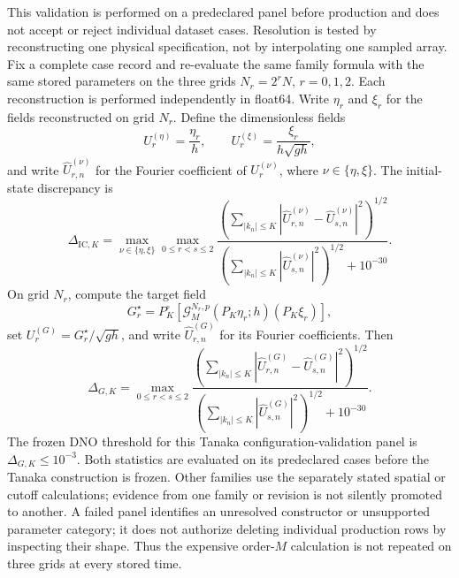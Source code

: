 \documentclass[11pt]{article}
\newcommand{\G}{\mathcal G}
\begin{document}
This validation is performed on a predeclared panel before production and
does not accept or reject individual dataset cases.  Resolution is tested by
reconstructing one physical specification, not by
interpolating one sampled array.  Fix a complete case record and re-evaluate
the same family formula with the same stored parameters on the three grids
$N_r=2^rN$, $r=0,1,2$.  Each reconstruction is performed independently in
float64.  Write $\eta_r$ and $\xi_r$ for the fields reconstructed on grid
$N_r$.  Define the dimensionless fields
\[
  U_r^{(\eta)}=\frac{\eta_r}{h},
  \qquad
  U_r^{(\xi)}=\frac{\xi_r}{h\sqrt{gh}},
\]
and write $\widehat U_{r,n}^{(\nu)}$ for the Fourier coefficient of
$U_r^{(\nu)}$, where $\nu\in\{\eta,\xi\}$.  The initial-state discrepancy is
\begin{equation}
  \Delta_{\mathrm{IC},K}
  =\max_{\nu\in\{\eta,\xi\}}\max_{0\leq r<s\leq2}
   \frac{
     \left(\sum_{|k_n|\leq K}
       |\widehat U_{r,n}^{(\nu)}-\widehat U_{s,n}^{(\nu)}|^2\right)^{1/2}}
        {\left(\sum_{|k_n|\leq K}|\widehat U_{s,n}^{(\nu)}|^2\right)^{1/2}
         +10^{-30}}.
  \label{eq:fixed-band-state-defect}
\end{equation}
On grid $N_r$, compute the target field
\begin{equation}
  G_r^\star=P_K^\circ\!\left[
    \G_M^{N_r,p}(P_K\eta_r;h)(P_K\xi_r)
  \right],
\end{equation}
set $U_r^{(G)}=G_r^\star/\sqrt{gh}$, and write
$\widehat U_{r,n}^{(G)}$ for its Fourier coefficients.  Then
\begin{equation}
  \Delta_{G,K}
  =\max_{0\leq r<s\leq2}
   \frac{
     \left(\sum_{|k_n|\leq K}
       |\widehat U_{r,n}^{(G)}-\widehat U_{s,n}^{(G)}|^2\right)^{1/2}}
        {\left(\sum_{|k_n|\leq K}|\widehat U_{s,n}^{(G)}|^2\right)^{1/2}
         +10^{-30}}.
  \label{eq:fixed-band-dno-defect}
\end{equation}
The frozen DNO threshold for this Tanaka configuration-validation panel is
$\Delta_{G,K}\leq10^{-3}$.  Both statistics are evaluated on its predeclared
cases before the Tanaka construction is frozen.  Other families use the
separately stated spatial or cutoff calculations; evidence from one family or
revision is not silently promoted to another.  A failed panel identifies an
unresolved constructor or unsupported parameter category; it does not
authorize deleting individual production rows by inspecting their shape.
Thus the expensive order-$M$ calculation is not repeated on three grids at
every stored time.
\end{document}
